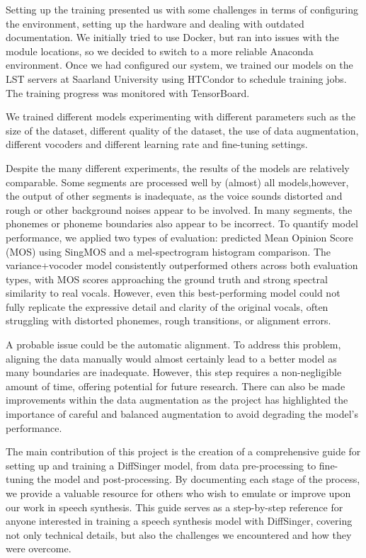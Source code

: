 \documentclass[a4paper]{article}
\begin{document}
Setting up the training presented us with some challenges in terms of configuring the environment, setting up the hardware and dealing with outdated documentation. We initially tried to use Docker, but ran into issues with the module locations, so we decided to switch to a more reliable Anaconda environment. Once we had configured our system, we trained our models on the LST servers at Saarland University using HTCondor to schedule training jobs. The training progress was monitored with TensorBoard.

We trained different models experimenting with different parameters such as the size of the dataset, different quality of the dataset, the use of data augmentation, different vocoders and different learning rate and fine-tuning settings.


Despite the many different experiments, the results of the models are relatively comparable. Some segments are processed well by (almost) all models,however, the output of other segments is inadequate, as the voice sounds distorted and rough or other background noises appear to be involved. In many segments, the phonemes or phoneme boundaries also appear to be incorrect. To quantify model performance, we applied two types of evaluation: predicted Mean Opinion Score (MOS) using SingMOS and a mel-spectrogram histogram comparison. The variance+vocoder model consistently outperformed others across both evaluation types, with MOS scores approaching the ground truth and strong spectral similarity to real vocals. However, even this best-performing model could not fully replicate the expressive detail and clarity of the original vocals, often struggling with distorted phonemes, rough transitions, or alignment errors. 

A probable issue could be the automatic alignment. To address this problem, aligning the data manually would almost certainly lead to a better model as many boundaries are inadequate. However, this step requires a non-negligible amount of time, offering potential for future research. There can also be made improvements within the data augmentation as the project has highlighted the importance of careful and balanced augmentation to avoid degrading the model’s performance.

The main contribution of this project is the creation of a comprehensive guide for setting up and training a DiffSinger model, from data pre-processing to fine-tuning the model and post-processing. By documenting each stage of the process, we provide a valuable resource for others who wish to emulate or improve upon our work in speech synthesis. This guide serves as a step-by-step reference for anyone interested in training a speech synthesis model with DiffSinger, covering not only technical details, but also the challenges we encountered and how they were overcome.
\end{document}
